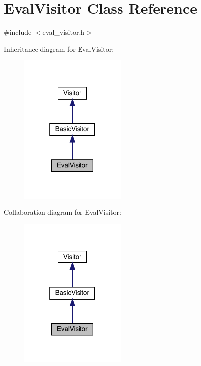 \hypertarget{class_eval_visitor}{}\section{Eval\+Visitor Class Reference}
\label{class_eval_visitor}


{\ttfamily \#include $<$eval\+\_\+visitor.\+h$>$}



Inheritance diagram for Eval\+Visitor\+:\nopagebreak
\begin{figure}[H]
\begin{center}
\leavevmode
\includegraphics[width=148pt]{class_eval_visitor__inherit__graph}
\end{center}
\end{figure}


Collaboration diagram for Eval\+Visitor\+:\nopagebreak
\begin{figure}[H]
\begin{center}
\leavevmode
\includegraphics[width=148pt]{class_eval_visitor__coll__graph}
\end{center}
\end{figure}

